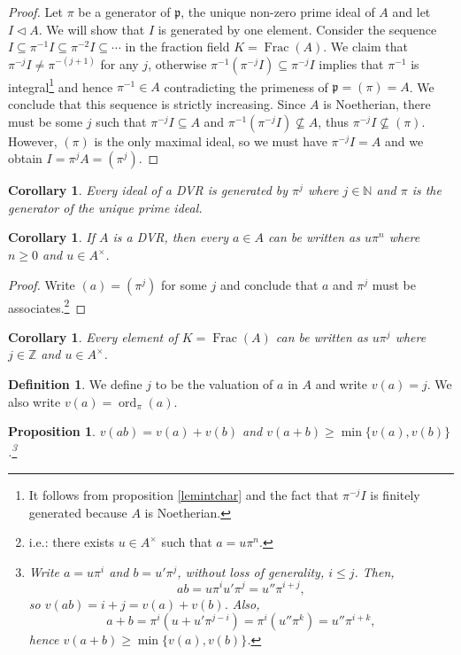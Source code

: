 \documentclass{tufte-handout} %
\newtheorem{cor}[thm]{Corollary}
\newtheorem{prop}[thm]{Proposition}
\theoremstyle{definition}
\newtheorem{defn}[thm]{Definition}
\theoremstyle{remark}
\newcommand{\N}{\mathbb{N}}
\newcommand{\Z}{\mathbb{Z}}
\newcommand{\lp}{{\mathfrak{p}}}
\DeclareMathOperator{\ff}{Frac}
\DeclareMathOperator{\ord}{ord}
\begin{document}
\begin{proof}
	Let $\pi$ be a generator of $\lp$, the unique non-zero prime ideal of $A$ and let $I \lhd A$. We will show that $I$ is generated by one element. Consider the sequence $I \subseteq \pi^{-1}I \subseteq \pi^{-2}I \subseteq \cdots$ in the fraction field $K = \ff(A)$. We claim that $\pi^{-j}I \neq \pi^{-(j+1)}$ for any $j$, otherwise $\pi^{-1}(\pi^{-j}I) \subseteq \pi^{-j}I$ implies that $\pi^{-1}$ is integral\footnote{It follows from proposition \ref{lemintchar} and the fact that $\pi^{-j}I$ is finitely generated because $A$ is Noetherian.} and hence $\pi^{-1} \in A$ contradicting the primeness of $\lp = (\pi) = A$. We conclude that this sequence is strictly increasing. Since $A$ is Noetherian, there must be some $j$ such that $\pi^{-j}I \subseteq A$ and $\pi^{-1}(\pi^{-j}I) \not\subseteq A$, thus $\pi^{-j}I \not\subseteq (\pi)$. However, $(\pi)$ is the only maximal ideal, so we must have $\pi^{-j}I = A$ and we obtain $I = \pi^jA = (\pi^j)$.
\end{proof}
\begin{cor}\label{dvrgenideal}
	Every ideal of a DVR is generated by $\pi^j$ where $j\in \N$ and $\pi$ is the generator of the unique prime ideal.
\end{cor}
\begin{cor}
	If $A$ is a DVR, then every $a \in A$ can be written as $u\pi^n$ where $n \geq 0$ and $u \in A^{\times}$.
\end{cor}
\begin{proof}
	Write $(a) = (\pi^j)$ for some $j$ and conclude that $a$ and $\pi^j$ must be associates.\footnote{i.e.: there exists $u \in A^{\times}$ such that $a = u\pi^n$.}
\end{proof}
\begin{cor}
	Every element of $K = \ff(A)$ can be written as $u\pi^{j}$ where $j \in \Z$ and $u \in A^{\times}$.
\end{cor}
\begin{defn}
	We define $j$ to be the valuation of $a$ in $A$ and write $v(a) = j$. We also write $v(a) = \ord_{\pi}(a)$.
\end{defn}
\begin{prop}
	$v(ab) = v(a)+v(b)$ and $v(a+b) \geq \min\{v(a), v(b)\}$.\footnote{Write $a = u\pi^i$ and $b = u'\pi^j$, without loss of generality, $i\leq j$. Then,
	\[ab = u\pi^iu'\pi^j = u''\pi^{i+j},\]
	so $v(ab) = i+j =  v(a) + v(b)$. Also,
	\[a+b = \pi^i(u+u'\pi^{j-i}) = \pi^i(u''\pi^k) = u''\pi^{i+k},\]
	hence $v(a+b) \geq \min\{v(a), v(b)\}$.}
\end{prop}
\end{document}
